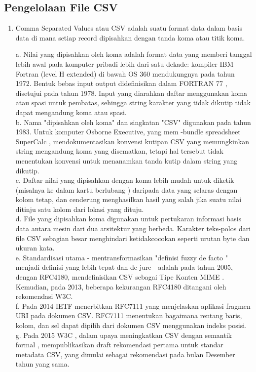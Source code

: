 \subsection{Pengelolaan File CSV}
\begin{enumerate}
\item
Comma Separated Values atau CSV adalah suatu format data dalam basis data di mana setiap record dipisahkan dengan tanda koma atau titik koma.

a.	Nilai yang dipisahkan oleh koma adalah format data yang memberi tanggal lebih awal pada komputer pribadi lebih dari satu dekade: kompiler IBM Fortran (level H extended) di bawah OS  360 mendukungnya pada tahun 1972. Bentuk bebas input output didefinisikan dalam FORTRAN 77 , disetujui pada tahun 1978. 
Input yang diarahkan daftar menggunakan koma atau spasi untuk pembatas, sehingga string karakter yang tidak dikutip tidak dapat mengandung koma atau spasi.\\
b.	Nama "dipisahkan oleh koma" dan singkatan "CSV" digunakan pada tahun 1983. Untuk komputer Osborne Executive, yang mem -bundle spreadsheet SuperCalc , mendokumentasikan konvensi kutipan CSV yang memungkinkan string mengandung koma yang disematkan, tetapi hal tersebut tidak menentukan konvensi untuk menanamkan tanda kutip dalam string yang dikutip.\\
c.	Daftar nilai yang dipisahkan dengan koma lebih mudah untuk diketik (misalnya ke dalam kartu berlubang ) daripada data yang selaras dengan kolom tetap, dan cenderung menghasilkan hasil yang salah jika suatu nilai ditinju satu kolom dari lokasi yang dituju.\\
d.	File yang dipisahkan koma digunakan untuk pertukaran informasi basis data antara mesin dari dua arsitektur yang berbeda. Karakter teks-polos dari file CSV sebagian besar menghindari ketidakcocokan seperti urutan byte dan ukuran kata.\\
e.	Standardisasi utama - mentransformasikan "definisi fuzzy de facto " menjadi definisi yang lebih tepat dan de jure - adalah pada tahun 2005, dengan RFC4180, mendefinisikan CSV sebagai Tipe Konten MIME . Kemudian, pada 2013, beberapa kekurangan RFC4180 ditangani oleh rekomendasi W3C.\\
f.	Pada 2014 IETF menerbitkan RFC7111 yang menjelaskan aplikasi fragmen URI pada dokumen CSV. RFC7111 menentukan bagaimana rentang baris, kolom, dan sel dapat dipilih dari dokumen CSV menggunakan indeks posisi.\\
g.	Pada 2015 W3C , dalam upaya meningkatkan CSV dengan semantik formal , mempublikasikan draft rekomendasi pertama untuk standar metadata CSV, yang dimulai sebagai rekomendasi pada bulan Desember tahun yang sama.\\


\end{enumerate}
